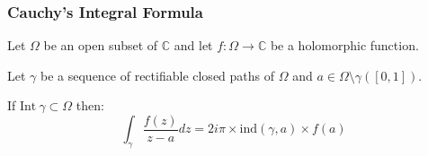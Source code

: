 \subsubsection{Cauchy's Integral Formula}
\begin{thm*}
    Let $\Omega$ be an open subset of $\mathbb{C}$ and let $f: \Omega \rightarrow \mathbb{C}$ be a holomorphic function.

    Let $\gamma$ be a sequence of rectifiable closed paths of $\Omega$ and $a\in\Omega\setminus\gamma([0,1])$.

    If $\mathrm{Int}~\gamma\subset\Omega$ then:
    $$\int_\gamma \frac{f(z)}{z-a}dz = 2i\pi \times \mathrm{ind}(\gamma, a) \times f(a)$$
\end{thm*}

